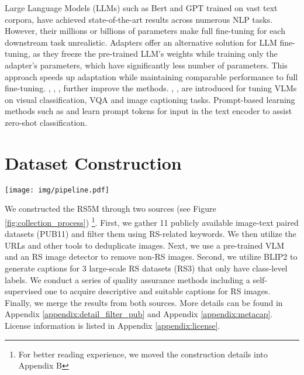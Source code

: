 \documentclass[journal]{IEEEtran}
\begin{document}
Large Language Models (LLMs) such as Bert \cite{bert} and GPT \cite{gpt} trained on vast text corpora, have achieved state-of-the-art results across numerous NLP tasks. However, their millions or billions of parameters make full fine-tuning for each downstream task unrealistic. Adapters \cite{houlsby2019parameterefficient} offer an alternative solution for LLM fine-tuning, as they freeze the pre-trained LLM's weights while training only the adapter's parameters, which have significantly less number of parameters. This approach speeds up adaptation while maintaining comparable performance to full fine-tuning. \cite{pfeiffer2021adapterfusion}, \cite{li2021prefixtuning}, \cite{hu2021lora}, \cite{unipelt} further improve the methods. \cite{clipadapter}, \cite{tipadapter}, \cite{vladapter} are introduced for tuning VLMs on visual classification, VQA and image captioning tasks. Prompt-based learning methods such as \cite{coop} and \cite{cocoop} learn prompt tokens for input in the text encoder to assist zero-shot classification.

\section{Dataset Construction}

\begin{figure*}
    \centering
    \texttt{[image: img/pipeline.pdf]}
    \caption{Overview of the collection process for RS5M. Circles represent different steps, gears stand for the model utilized, rectangles represent the images, and dash lines connect to the optional step.}
    \label{fig:collection_process}
    
\end{figure*}

We constructed the RS5M through two sources (see Figure \ref{fig:collection_process}) \footnote{For better reading experience, we moved the construction details into Appendix B}. First, we gather 11 publicly available image-text paired datasets (PUB11) and filter them using RS-related keywords. We then utilize the URLs and other tools to deduplicate images. Next, we use a pre-trained VLM and an RS image detector to remove non-RS images. Second, we utilize BLIP2 \cite{blip2} to generate captions for 3 large-scale RS datasets (RS3) that only have class-level labels. We conduct a series of quality assurance methods including a self-supervised one to acquire descriptive and suitable captions for RS images. Finally, we merge the results from both sources. More details can be found in Appendix \ref{appendix:detail_filter_pub} and Appendix \ref{appendix:metacap}. License information is listed in Appendix \ref{appendix:license}.
\end{document}
